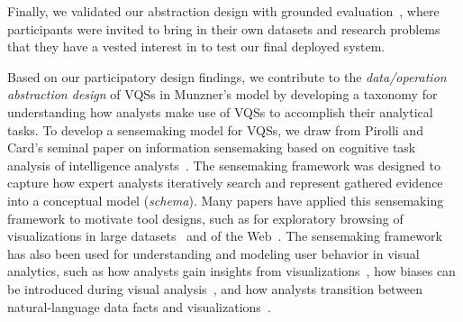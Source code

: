   \par Finally, we validated our abstraction design with grounded evaluation~\cite{Plaisant2004,Isenberg2008}, where participants were invited to bring in their own datasets and research problems that they have a vested interest in to test our final deployed system.%
  \par {}
  \npar Based on our participatory design findings, we contribute to the \textit{data/operation abstraction design} of VQSs in Munzner's model by developing a taxonomy for understanding how analysts make use of VQSs to accomplish their analytical tasks. To develop a sensemaking model for VQSs, we draw from Pirolli and Card's seminal paper on information sensemaking based on cognitive task analysis of intelligence analysts~\cite{Pirolli}. The sensemaking framework was designed to capture how expert analysts iteratively search and represent gathered evidence into a conceptual model (\emph{schema}). Many papers have applied this sensemaking framework to motivate tool designs, such as for exploratory browsing of visualizations in large datasets~\cite{Battle2016} and of the Web~\cite{Olston2003}. The sensemaking framework has also been used for understanding and modeling user behavior in visual analytics, such as how analysts gain insights from visualizations~\cite{Yi2008}, how biases can be introduced during visual analysis~\cite{Wall2017}, and how analysts transition between natural-language data facts and visualizations~\cite{Srinivasan2019}. 
